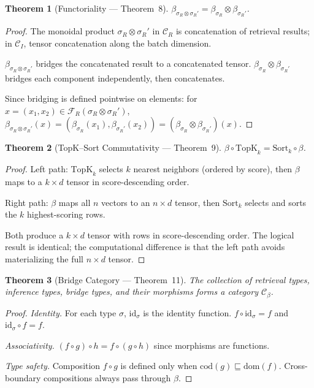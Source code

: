 \documentclass{article}
\newtheorem{theorem}{Theorem}
\theoremstyle{definition}
\theoremstyle{remark}
\begin{document}
\begin{theorem}[Functoriality --- Theorem~8]\label{thm:functoriality-app}
$\beta_{\sigma_R \otimes \sigma_R'} = \beta_{\sigma_R} \otimes \beta_{\sigma_R'}$.
\end{theorem}

\begin{proof}
The monoidal product $\sigma_R \otimes \sigma_R'$ in $\mathcal{C}_R$ is concatenation of retrieval results; in $\mathcal{C}_I$, tensor concatenation along the batch dimension.

$\beta_{\sigma_R \otimes \sigma_R'}$ bridges the concatenated result to a concatenated tensor.
$\beta_{\sigma_R} \otimes \beta_{\sigma_R'}$ bridges each component independently, then concatenates.

Since bridging is defined pointwise on elements: for $x = (x_1, x_2) \in \mathcal{F}_R(\sigma_R \otimes \sigma_R')$,
$\beta_{\sigma_R \otimes \sigma_R'}(x) = (\beta_{\sigma_R}(x_1), \beta_{\sigma_R'}(x_2)) = (\beta_{\sigma_R} \otimes \beta_{\sigma_R'})(x)$.
\end{proof}

\begin{theorem}[TopK--Sort Commutativity --- Theorem~9]\label{thm:topk-sort-app}
$\beta \circ \mathrm{TopK}_k = \mathrm{Sort}_k \circ \beta$.
\end{theorem}

\begin{proof}
Left path: $\mathrm{TopK}_k$ selects $k$ nearest neighbors (ordered by score), then $\beta$ maps to a $k \times d$ tensor in score-descending order.

Right path: $\beta$ maps all $n$ vectors to an $n \times d$ tensor, then $\mathrm{Sort}_k$ selects and sorts the $k$ highest-scoring rows.

Both produce a $k \times d$ tensor with rows in score-descending order. The logical result is identical; the computational difference is that the left path avoids materializing the full $n \times d$ tensor.
\end{proof}

\begin{theorem}[Bridge Category --- Theorem~11]\label{thm:bridge-cat}
The collection of retrieval types, inference types, bridge types, and their morphisms forms a category $\mathcal{C}_\beta$.
\end{theorem}

\begin{proof}
\emph{Identity.} For each type $\sigma$, $\mathrm{id}_\sigma$ is the identity function. $f \circ \mathrm{id}_\sigma = f$ and $\mathrm{id}_\sigma \circ f = f$.

\emph{Associativity.} $(f \circ g) \circ h = f \circ (g \circ h)$ since morphisms are functions.

\emph{Type safety.} Composition $f \circ g$ is defined only when $\mathrm{cod}(g) \sqsubseteq \mathrm{dom}(f)$. Cross-boundary compositions always pass through $\beta$.
\end{proof}
\end{document}
